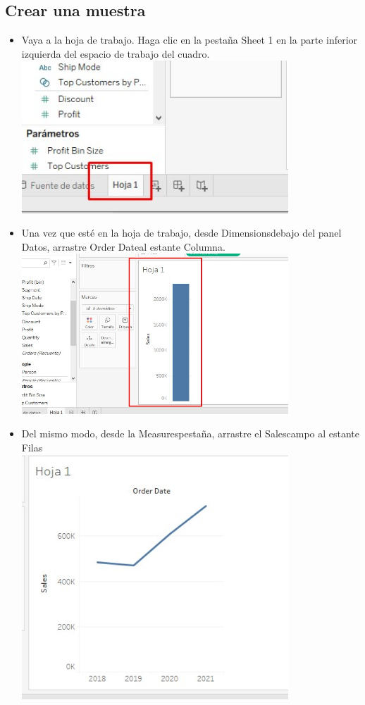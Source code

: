 \documentclass[preprint,12pt]{elsarticle}
\begin{document}
		\subsection{Crear una muestra}
		\begin{itemize}
			\item Vaya a la hoja de trabajo. Haga clic en la pestaña Sheet 1 en la parte inferior izquierda del
			espacio de trabajo del cuadro. 
			\\	\includegraphics[width=10cm]{./IMAGENES/3.2.1}
			
			\item Una vez que esté en la hoja de trabajo, desde Dimensionsdebajo del panel Datos,
			arrastre Order Dateal estante Columna.
			\\	\includegraphics[width=10cm]{./IMAGENES/3.2.3}
			
			\item  Del mismo modo, desde la Measurespestaña, arrastre el Salescampo al estante Filas
			\\	\includegraphics[width=10cm]{./IMAGENES/3.2.4}
		
		\end{itemize}
	
\end{document}
